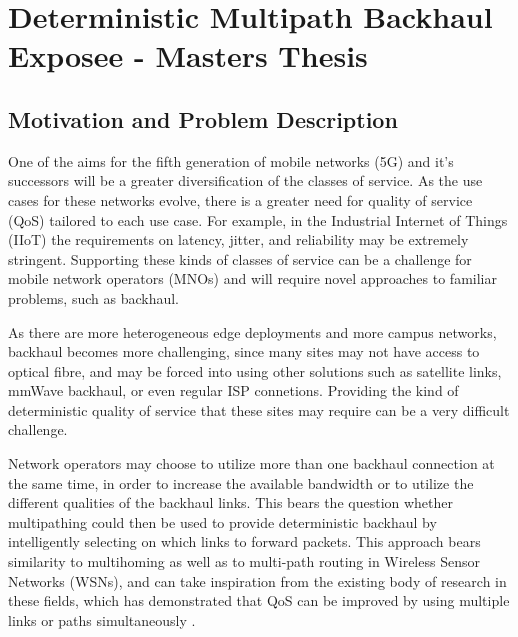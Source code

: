 
\cleardoublepage
\chapter{Deterministic Multipath Backhaul Exposee - Masters Thesis}

\label{cha:introduction}

\section{Motivation and Problem Description}
\label{sec:motivation}

One of the aims for the fifth generation of mobile networks (5G) and it's successors will be a greater diversification of the classes of service. As the use cases for these networks evolve, there is a greater need for quality of service (QoS) tailored to each use case. For example, in the Industrial Internet of Things (IIoT) the requirements on latency, jitter, and reliability may be extremely stringent. Supporting these kinds of classes of service can be a challenge for mobile network operators (MNOs) and will require novel approaches to familiar problems, such as backhaul.

As there are more heterogeneous edge deployments and more campus networks, backhaul becomes more challenging, since many sites may not have access to optical fibre, and may be forced into using other solutions such as satellite links, mmWave backhaul, or even regular ISP connetions. Providing the kind of deterministic quality of service that these sites may require can be a very difficult challenge.

Network operators may choose to utilize more than one backhaul connection at the same time, in order to increase the available bandwidth or to utilize the different qualities of the backhaul links. This bears the question whether multipathing could then be used to provide deterministic backhaul by intelligently selecting on which links to forward packets. This approach bears similarity to multihoming as well as to multi-path routing in Wireless Sensor Networks (WSNs), and can take inspiration from the existing body of research in these fields, which has demonstrated that QoS can be improved by using multiple links or paths simultaneously \cite{akella2003measurement, tao2005improving, habib2007improving, goldenberg2004optimizing, huang2008multiconstrained, akella2008performance}.


